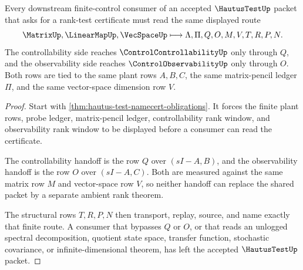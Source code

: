 \begin{theorem}
\label{thm:hautus-test-controllability-observability-handoff}
Every downstream finite-control consumer of an accepted $\HautusTestUp$ packet that asks for a rank-test certificate must read the same displayed route
$$
\MatrixUp,\LinearMapUp,\VecSpaceUp
\longmapsto
\Lambda,\Pi,Q,O,M,V,T,R,P,N .
$$
The controllability side reaches $\ControlControllabilityUp$ only through $Q$, and the observability side reaches $\ControlObservabilityUp$ only through $O$. Both rows are tied to the same plant rows $A,B,C$, the same matrix-pencil ledger $\Pi$, and the same vector-space dimension row $V$.
\end{theorem}
\begin{proof}
Start with \autoref{thm:hautus-test-namecert-obligations}. It forces the finite plant rows, probe ledger, matrix-pencil ledger, controllability rank window, and observability rank window to be displayed before a consumer can read the certificate.

The controllability handoff is the row $Q$ over $(sI-A,B)$, and the observability handoff is the row $O$ over $(sI-A,C)$. Both are measured against the same matrix row $M$ and vector-space row $V$, so neither handoff can replace the shared packet by a separate ambient rank theorem.

The structural rows $T,R,P,N$ then transport, replay, source, and name exactly that finite route. A consumer that bypasses $Q$ or $O$, or that reads an unlogged spectral decomposition, quotient state space, transfer function, stochastic covariance, or infinite-dimensional theorem, has left the accepted $\HautusTestUp$ packet.
\end{proof}




